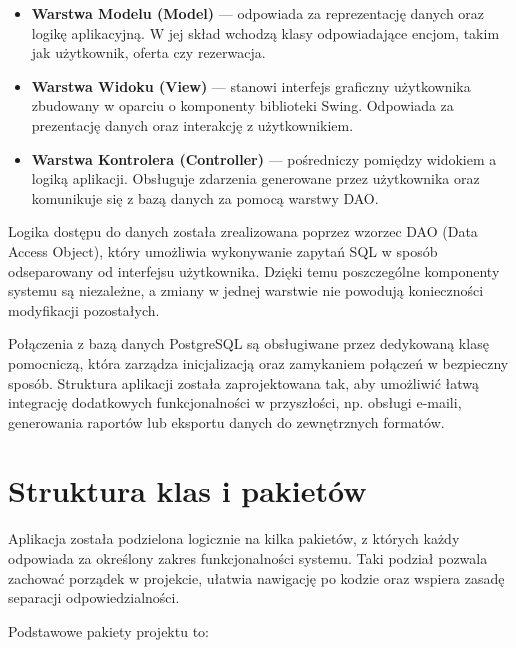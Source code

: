 \begin{itemize}
    \item \textbf{Warstwa Modelu (Model)} — odpowiada za reprezentację danych oraz logikę aplikacyjną. W jej skład wchodzą klasy odpowiadające encjom, takim jak użytkownik, oferta czy rezerwacja.
    
    \item \textbf{Warstwa Widoku (View)} — stanowi interfejs graficzny użytkownika zbudowany w oparciu o komponenty biblioteki Swing. Odpowiada za prezentację danych oraz interakcję z użytkownikiem.
    
    \item \textbf{Warstwa Kontrolera (Controller)} — pośredniczy pomiędzy widokiem a logiką aplikacji. Obsługuje zdarzenia generowane przez użytkownika oraz komunikuje się z bazą danych za pomocą warstwy DAO.
\end{itemize}

Logika dostępu do danych została zrealizowana poprzez wzorzec DAO (Data Access Object), który umożliwia wykonywanie zapytań SQL w sposób odseparowany od interfejsu użytkownika. Dzięki temu poszczególne komponenty systemu są niezależne, a zmiany w jednej warstwie nie powodują konieczności modyfikacji pozostałych.

Połączenia z bazą danych PostgreSQL są obsługiwane przez dedykowaną klasę pomocniczą, która zarządza inicjalizacją oraz zamykaniem połączeń w bezpieczny sposób. Struktura aplikacji została zaprojektowana tak, aby umożliwić łatwą integrację dodatkowych funkcjonalności w przyszłości, np. obsługi e-maili, generowania raportów lub eksportu danych do zewnętrznych formatów.



\section{Struktura klas i pakietów}
\label{sec:Struktura klas i pakietów}

Aplikacja została podzielona logicznie na kilka pakietów, z których każdy odpowiada za określony zakres funkcjonalności systemu. Taki podział pozwala zachować porządek w projekcie, ułatwia nawigację po kodzie oraz wspiera zasadę separacji odpowiedzialności.

Podstawowe pakiety projektu to:

